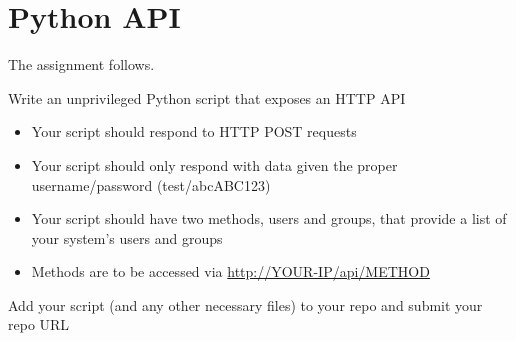 \documentclass{article}
\begin{document}
\newpage

\section{Python API}

The assignment follows. \vspace{1em}

Write an unprivileged Python script that exposes an HTTP API

\begin{itemize}

	\item

		Your script should respond to HTTP POST requests

	\item

		Your script should only respond with data given the proper
		username/password (test/abcABC123)

	\item

		Your script should have two methods, users and groups, that
		provide a list of your system's users and groups

	\item

		Methods are to be accessed via \url{http://YOUR-IP/api/METHOD}

\end{itemize}

Add your script (and any other necessary files) to your repo and submit your
repo URL
\end{document}
